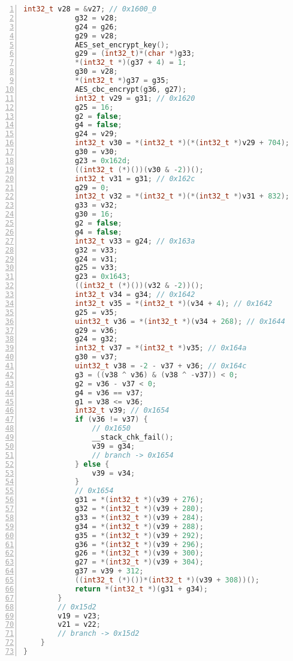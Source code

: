 \begin{appendices}
\begin{lstlisting}[language=C++, caption=Decompiled AES Encrypt(), label=dec_aes_encrypt, numbers=left]
            int32_t v28 = &v27; // 0x1600_0
            g32 = v28;
            g24 = g26;
            g29 = v28;
            AES_set_encrypt_key();
            g29 = (int32_t)*(char *)g33;
            *(int32_t *)(g37 + 4) = 1;
            g30 = v28;
            *(int32_t *)g37 = g35;
            AES_cbc_encrypt(g36, g27);
            int32_t v29 = g31; // 0x1620
            g25 = 16;
            g2 = false;
            g4 = false;
            g24 = v29;
            int32_t v30 = *(int32_t *)(*(int32_t *)v29 + 704); // 0x1626
            g30 = v30;
            g23 = 0x162d;
            ((int32_t (*)())(v30 & -2))();
            int32_t v31 = g31; // 0x162c
            g29 = 0;
            int32_t v32 = *(int32_t *)(*(int32_t *)v31 + 832); // 0x1634
            g33 = v32;
            g30 = 16;
            g2 = false;
            g4 = false;
            int32_t v33 = g24; // 0x163a
            g32 = v33;
            g24 = v31;
            g25 = v33;
            g23 = 0x1643;
            ((int32_t (*)())(v32 & -2))();
            int32_t v34 = g34; // 0x1642
            int32_t v35 = *(int32_t *)(v34 + 4); // 0x1642
            g25 = v35;
            uint32_t v36 = *(int32_t *)(v34 + 268); // 0x1644
            g29 = v36;
            g24 = g32;
            int32_t v37 = *(int32_t *)v35; // 0x164a
            g30 = v37;
            uint32_t v38 = -2 - v37 + v36; // 0x164c
            g3 = ((v38 ^ v36) & (v38 ^ -v37)) < 0;
            g2 = v36 - v37 < 0;
            g4 = v36 == v37;
            g1 = v38 <= v36;
            int32_t v39; // 0x1654
            if (v36 != v37) {
                // 0x1650
                __stack_chk_fail();
                v39 = g34;
                // branch -> 0x1654
            } else {
                v39 = v34;
            }
            // 0x1654
            g31 = *(int32_t *)(v39 + 276);
            g32 = *(int32_t *)(v39 + 280);
            g33 = *(int32_t *)(v39 + 284);
            g34 = *(int32_t *)(v39 + 288);
            g35 = *(int32_t *)(v39 + 292);
            g36 = *(int32_t *)(v39 + 296);
            g26 = *(int32_t *)(v39 + 300);
            g27 = *(int32_t *)(v39 + 304);
            g37 = v39 + 312;
            ((int32_t (*)())*(int32_t *)(v39 + 308))();
            return *(int32_t *)(g31 + g34);
        }
        // 0x15d2
        v19 = v23;
        v21 = v22;
        // branch -> 0x15d2
    }
}
\end{lstlisting}



\end{appendices}
